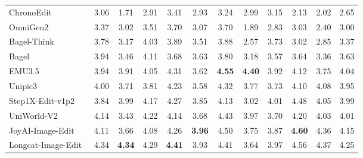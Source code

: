 \begin{table}[t]
{\begin{tabular}{l|cccccccccc|c}
            ChronoEdit~\cite{wu2025chronoedit}
            & 3.06 & 1.71 & 2.91 & 3.41 & 2.93 & 3.24 & 2.99 & 3.15 & 2.13 & 2.02
            & \cellcolor[HTML]{C8C8C8}2.65 \\

            OmniGen2~\cite{wu2025omnigen2}
            & 3.37 & 3.02 & 3.51 & 3.70 & 3.07 & 3.70 & 1.89 & 2.83 & 3.03 & 2.40
            & \cellcolor[HTML]{C8C8C8}3.00 \\

            Bagel-Think~\cite{deng2025emerging}
            & 3.78 & 3.17 & 4.03 & 3.89 & 3.51 & 3.88 & 2.57 & 3.73 & 3.02 & 2.85
            & \cellcolor[HTML]{C8C8C8}3.37 \\
            
            Bagel~\cite{deng2025emerging}
            & 3.94 & 3.46 & 4.11 & 3.68 & 3.63 & 3.80 & 3.18 & 3.57 & 3.64 & 3.36
            & \cellcolor[HTML]{C8C8C8}3.63 \\

            EMU3.5~\cite{cui2025emu3}
            & 3.94 & 3.91 & 4.05 & 4.31 & 3.62 & \color[HTML]{F88825}\textbf{4.55} & \color[HTML]{F88825}\textbf{4.40} & 3.92 & 4.12 & 3.75
            & \cellcolor[HTML]{C8C8C8}4.04 \\

            Unipic3~\cite{wei2026skywork}
            & 4.00 & 3.71 & 3.81 & 4.23 & 3.58 & 4.32 & 3.77 & 3.73 & 4.10 & 4.08
            & \cellcolor[HTML]{C8C8C8}3.95 \\

            Step1X-Edit-v1p2~\cite{liu2025step1x}
            & 3.84 & 3.99 & 4.17 & 4.27 & 3.85 & 4.13 & 3.02 & 4.01 & 4.48 & 4.05
            & \cellcolor[HTML]{C8C8C8}3.99 \\
            
            UniWorld-V2~\cite{li2025uniworld}
            & 4.14 & 3.43 & 4.22 & 4.14 & 3.68 & 4.43 & 3.97 & 3.70 & 4.20 & 4.03
            & \cellcolor[HTML]{C8C8C8}4.01 \\

            JoyAI-Image-Edit~\cite{joyaiimage2026}
            & 4.11 & 3.66 & 4.08 & 4.26 & \color[HTML]{F88825}\textbf{3.96} & 4.50 & 3.75 & 3.87 & \color[HTML]{F88825}\textbf{4.60} & 4.36
            & \cellcolor[HTML]{C8C8C8}4.15 \\

            Longcat-Image-Edit~\cite{team2025longcat}
            & 4.34 & \color[HTML]{F88825}\textbf{4.34} & 4.29 & \color[HTML]{F88825}\textbf{4.41} &  3.93  & 4.41 & 3.64 & 3.97 &  4.56  & 4.37
            & \cellcolor[HTML]{C8C8C8}4.25 \\


\end{tabular}}
\end{table}
